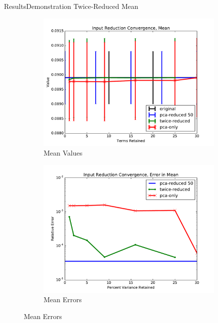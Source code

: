 \documentclass{beamer}
\begin{document}
\begin{frame}{Results}{Demonstration Twice-Reduced Mean}
  \begin{figure}[h!]
    \centering
    \begin{subfigure}[b]{0.49\textwidth}
      \includegraphics[width=\textwidth]{graphics/mean}
      \caption{Mean Values}
      \label{twice 9v mean val}
    \end{subfigure}
    \begin{subfigure}[b]{0.49\textwidth}
      \includegraphics[width=\textwidth]{graphics/mean_err}
      \caption{Mean Errors}
      \label{twice 9v mean err}
    \end{subfigure}
  \end{figure}
\end{frame}
\end{document}

